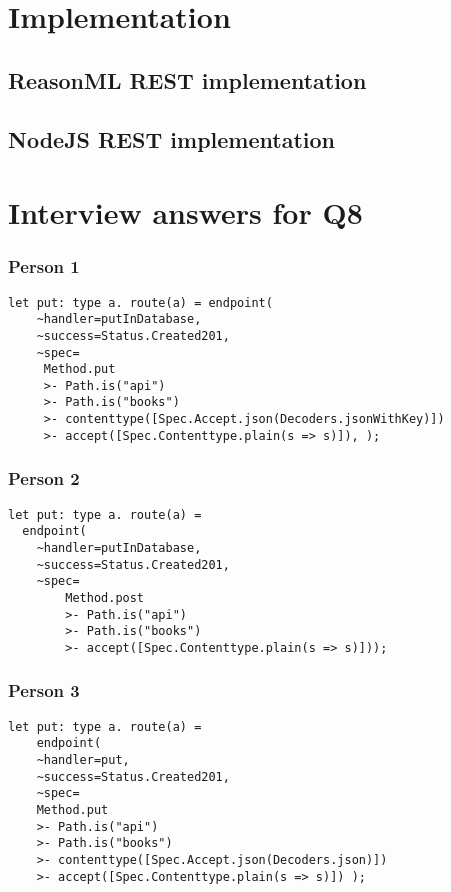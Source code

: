 \begin{appendices}
\chapter{Implementation}\label{appendix}

\section{ReasonML REST implementation}\label{reasonmlrest}
\section{NodeJS REST implementation}\label{nodejsrest}

\chapter{Interview answers for Q8}
\subsection{Person 1}\label{putperson1}
\begin{lstlisting}
let put: type a. route(a) = endpoint(
	~handler=putInDatabase, 
    ~success=Status.Created201, 
    ~spec= 
	 Method.put 
	 >- Path.is("api")
	 >- Path.is("books") 
	 >- contenttype([Spec.Accept.json(Decoders.jsonWithKey)]) 
	 >- accept([Spec.Contenttype.plain(s => s)]), ); 
\end{lstlisting}

\subsection{Person 2}\label{putperson2}
\begin{lstlisting}
let put: type a. route(a) =
  endpoint(
	~handler=putInDatabase,
	~success=Status.Created201,
	~spec=
		Method.post
		>- Path.is("api")
		>- Path.is("books")
		>- accept([Spec.Contenttype.plain(s => s)]));
\end{lstlisting}

\subsection{Person 3}\label{putperson3}
\begin{lstlisting}
let put: type a. route(a) =
    endpoint(
	~handler=put,
	~success=Status.Created201,
	~spec=
	Method.put
	>- Path.is("api")
	>- Path.is("books")
	>- contenttype([Spec.Accept.json(Decoders.json)])
	>- accept([Spec.Contenttype.plain(s => s)]) );
\end{lstlisting}


\end{appendices}

